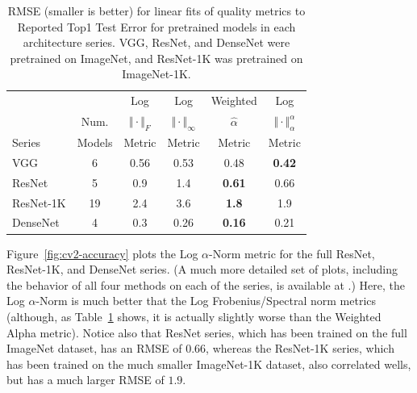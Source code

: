 \begin{table}[t]
\small
\begin{center}
\begin{tabular}{|p{0.75in}|c|c|c|c|c|}
\hline
        &        & Log                   & Log                        & Weighted       & Log                                 \\
        & Num.   & $\Vert\cdot\Vert_{F}$ & $\Vert\cdot\Vert_{\infty}$ & $\hat{\alpha}$ & $\Vert\cdot\Vert^{\alpha}_{\alpha}$ \\
 Series & Models & Metric                & Metric                     & Metric         & Metric                              \\
\hline
 VGG       &  6 & 0.56 & 0.53 & 0.48          & \textbf{0.42}  \\
 ResNet    &  5 & 0.9  & 1.4  & \textbf{0.61} & 0.66           \\
 ResNet-1K & 19 & 2.4  & 3.6  & \textbf{1.8}  & 1.9            \\
 DenseNet  &  4 & 0.3  & 0.26 & \textbf{0.16} & 0.21           \\
\hline
\end{tabular}
\end{center}
\caption{RMSE (smaller is better) for linear fits of quality metrics to Reported Top1 Test Error for pretrained models in each architecture series.  VGG, ResNet, and DenseNet were pretrained on ImageNet, and ResNet-1K was pretrained on ImageNet-1K. 
}
\label{table:cv-models}
\end{table}


Figure~\ref{fig:cv2-accuracy} plots the 
Log $\alpha$-Norm
metric for the full ResNet, ResNet-1K, and DenseNet series.
(A much more detailed set of plots, including the behavior of all four methods on each of the series, is available at \cite{XXX-WEB-LINK}.)
Here, the Log $\alpha$-Norm is much better that the Log Frobenius/Spectral norm metrics (although, as Table~\ref{table:cv-models} shows, it is actually slightly worse than the Weighted Alpha metric).
Notice also that ResNet series, which has been trained on the full ImageNet dataset, has an RMSE of $0.66$, whereas the ResNet-1K series, which has been trained on the much smaller ImageNet-1K dataset, also correlated wells, but has a much larger RMSE of $1.9$.

